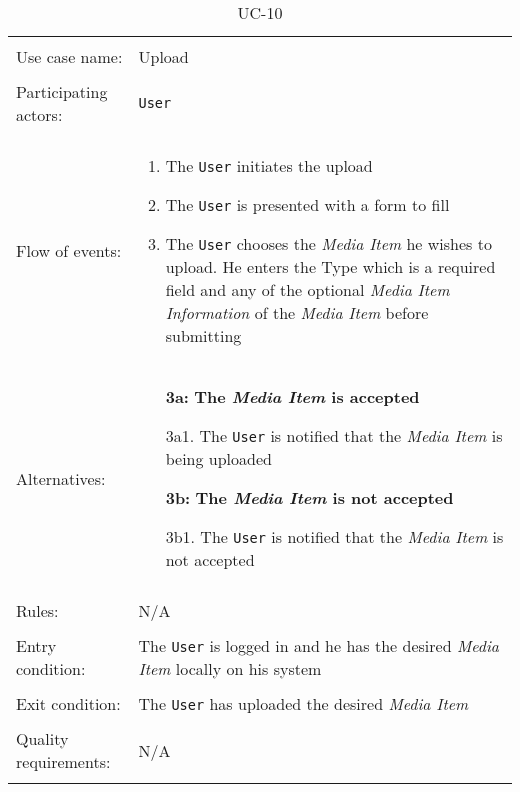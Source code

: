 \noindent
\begin{table}[h!]
\caption{UC-10}
\label{UC-10}
\centering
\begin{tabular}{ l p{8cm} } 
\hline  
\\                   
Use case name:  & Upload   \\   \hline \\               
Participating actors:  & \texttt{User} \\   \hline \\         
Flow of events: & \begin{enumerate}
\item{The \texttt{User} initiates the upload}
\item{The \texttt{User} is presented with a form to fill}
\item{The \texttt{User} chooses the \textit{Media Item} he wishes to upload. He enters the Type which is a required field and any of the optional \textit{Media Item Information} of the \textit{Media Item} before submitting}
\end{enumerate} \\
Alternatives: & \begin{itemize}
\item[\textbf{3a:}] \textbf{The \textit{Media Item} is accepted}
\item[]  3a1. The \texttt{User} is notified that the \textit{Media Item} is being uploaded
\item[\textbf{3b:}] \textbf{The \textit{Media Item} is not accepted}
\item[]  3b1. The \texttt{User} is notified that the \textit{Media Item} is not accepted
\end{itemize}
\\   \hline \\
Rules: & N/A \\ \hline \\
Entry condition: & The \texttt{User} is logged in and he has the desired \textit{Media Item} locally on his system \\ \hline \\
Exit condition: & The \texttt{User} has uploaded the desired \textit{Media Item} \\ \hline \\
Quality requirements: & N/A \\ \hline \\
\end{tabular} \\
\end{table}

